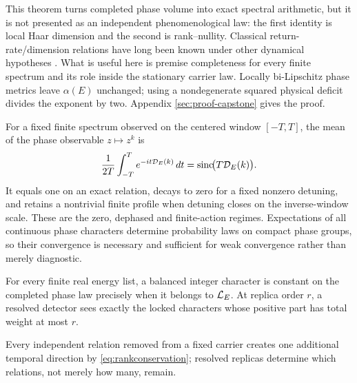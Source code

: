 This theorem turns completed phase volume into exact spectral arithmetic, but
it is not presented as an independent phenomenological law: the first
identity is local Haar dimension and the second is rank--nullity.  Classical
return-rate/dimension relations have long been known under other dynamical
hypotheses \cite{Gao1999,BarreiraSaussol2001,Saussol2006}.  What is useful
here is premise completeness for every finite spectrum and its role inside
the stationary carrier law.  Locally bi-Lipschitz phase metrics leave
$\alpha(E)$ unchanged; using a nondegenerate squared physical deficit divides
the exponent by two.  Appendix \ref{sec:proof-capstone} gives the proof.

For a fixed finite spectrum observed on the centered window $[-T,T]$, the
mean of the phase observable $z\mapsto z^k$ is
\begin{equation}
 \frac1{2T}\int_{-T}^{T}e^{-it\mathcal D_E(k)}\,dt
 =\operatorname{sinc}\!\bigl(T\mathcal D_E(k)\bigr).               \label{eq:characteraction}
\end{equation}
It equals one on an exact relation, decays to zero for a fixed nonzero
detuning, and retains a nontrivial finite profile when detuning closes on the
inverse-window scale.  These are the zero, dephased and finite-action regimes.
Expectations of all continuous phase characters determine probability laws on
compact phase groups, so their convergence is necessary and sufficient for
weak convergence rather than merely diagnostic.

\begin{theorem}
\label{thm:phasecapacity}
For every finite real energy list, a balanced integer character is constant
on the completed phase law precisely
when it belongs to $\mathcal L_E$.  At replica order $r$, a resolved detector sees
exactly the locked characters whose positive part has total weight at most
$r$.
\end{theorem}

Every independent relation removed from a fixed carrier creates one
additional temporal direction by \eqref{eq:rankconservation}; resolved
replicas determine which relations, not merely how many, remain.

